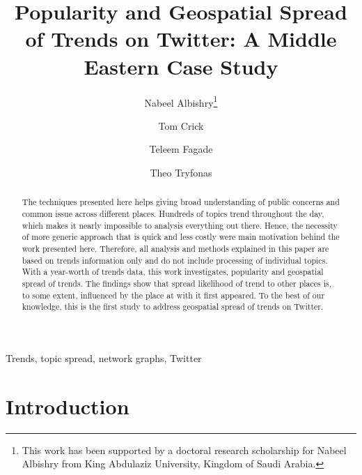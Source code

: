 \documentclass{llncs}
\begin{document}
\title{Popularity and Geospatial Spread of Trends on Twitter: A Middle
Eastern Case Study}

\author{Nabeel Albishry\thanks{This work has been supported by a doctoral research scholarship for
Nabeel Albishry from King Abdulaziz University, Kingdom of Saudi
Arabia.} \and Tom
  Crick \and Teleem Fagade \and Theo Tryfonas}


\maketitle

\begin{abstract}
The techniques presented here helps giving broad understanding of
public concerns and common issue across different places. Hundreds of
topics trend throughout the day, which makes it nearly impossible to
analysis everything out there. Hence, the necessity of more generic
approach that is quick and less costly were main motivation behind the
work presented here. Therefore, all analysis and methods explained in
this paper are based on trends information only and do not include
processing of individual topics. With a year-worth of trends data,
this work investigates, popularity and geospatial spread of
trends. The findings show that spread likelihood of trend to other
places is, to some extent, influenced by the place at with it first
appeared. To the best of our knowledge, this is the first study to
address geospatial spread of trends on Twitter.
 \end{abstract}

\begin{keywords}
Trends, topic spread, network graphs, Twitter
\end{keywords}

\section{Introduction}\label{intro}
\end{document}
